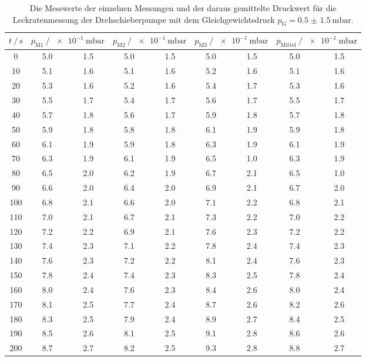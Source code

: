   \begin{table}[h]
    \centering
    \caption{Die Messwerte der einzelnen Messungen und der daraus gemittelte Druckwert für die Leckratenmessung der Drehschieberpumpe mit dem 
    Gleichgewichtsdruck $p_\text{G} = \SI{0.5(15)}{\milli\bar}$.}
    \label{tab:dreh_leck_05}
    \begin{tabular}{S[table-format=3.0] S @{${}\pm{}$} S S @{${}\pm{}$} S S @{${}\pm{}$} S S @{${}\pm{}$} S}
    \toprule
    {$t \mathbin{/} \si{\second} $} &  &  &  &  \\
     & 5.0 & 1.5 & 5.0 & 1.5 & 5.0 & 1.5 & 5.0 & 1.5 \\  
      10 & 5.1 & 1.6 & 5.1 & 1.6 & 5.2 & 1.6 & 5.1 & 1.6 \\
      20 & 5.3 & 1.6 & 5.2 & 1.6 & 5.4 & 1.7 & 5.3 & 1.6 \\
      30 & 5.5 & 1.7 & 5.4 & 1.7 & 5.6 & 1.7 & 5.5 & 1.7 \\
      40 & 5.7 & 1.8 & 5.6 & 1.7 & 5.9 & 1.8 & 5.7 & 1.8 \\
      50 & 5.9 & 1.8 & 5.8 & 1.8 & 6.1 & 1.9 & 5.9 & 1.8 \\
      60 & 6.1 & 1.9 & 5.9 & 1.8 & 6.3 & 1.9 & 6.1 & 1.9 \\
      70 & 6.3 & 1.9 & 6.1 & 1.9 & 6.5 & 1.0 & 6.3 & 1.9 \\
      80 & 6.5 & 2.0 & 6.2 & 1.9 & 6.7 & 2.1 & 6.5 & 1.0 \\
      90 & 6.6 & 2.0 & 6.4 & 2.0 & 6.9 & 2.1 & 6.7 & 2.0 \\
     100 & 6.8 & 2.1 & 6.6 & 2.0 & 7.1 & 2.2 & 6.8 & 2.1 \\
     110 & 7.0 & 2.1 & 6.7 & 2.1 & 7.3 & 2.2 & 7.0 & 2.2 \\
     120 & 7.2 & 2.2 & 6.9 & 2.1 & 7.6 & 2.3 & 7.2 & 2.2 \\
     130 & 7.4 & 2.3 & 7.1 & 2.2 & 7.8 & 2.4 & 7.4 & 2.3 \\
     140 & 7.6 & 2.3 & 7.2 & 2.2 & 8.1 & 2.4 & 7.6 & 2.3 \\
     150 & 7.8 & 2.4 & 7.4 & 2.3 & 8.3 & 2.5 & 7.8 & 2.4 \\
     160 & 8.0 & 2.4 & 7.6 & 2.3 & 8.4 & 2.6 & 8.0 & 2.4 \\
     170 & 8.1 & 2.5 & 7.7 & 2.4 & 8.7 & 2.6 & 8.2 & 2.6 \\
     180 & 8.3 & 2.5 & 7.9 & 2.4 & 8.9 & 2.7 & 8.4 & 2.5 \\
     190 & 8.5 & 2.6 & 8.1 & 2.5 & 9.1 & 2.8 & 8.6 & 2.6 \\
     200 & 8.7 & 2.7 & 8.2 & 2.5 & 9.3 & 2.8 & 8.8 & 2.7 \\
    \bottomrule
    \end{tabular}
  \end{table}

